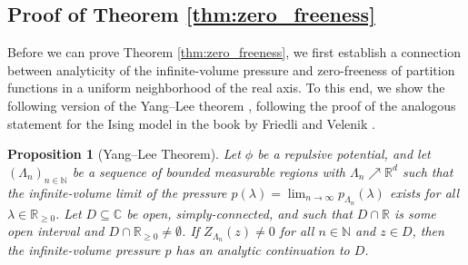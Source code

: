 \documentclass[10pt]{amsart}
\newtheorem{proposition}[theorem]{Proposition}
\theoremstyle{definition}
\theoremstyle{remark}
\newcommand{\N}{\mathbb{N}}
\newcommand{\R}{\mathbb{R}}
\newcommand{\C}{\mathbb{C}}
\newcommand{\region}{\Lambda}
\newcommand{\potential}{\phi}
\newcommand{\activity}{\lambda}
\begin{document}
	\subsection{Proof of Theorem \texorpdfstring{\ref{thm:zero_freeness}}{5.1}}
	Before we can prove Theorem \ref{thm:zero_freeness}, we first establish a connection between analyticity of the infinite-volume pressure and zero-freeness of partition functions in a uniform neighborhood of the real axis.
	To this end, we show the following version of the Yang--Lee theorem \cite{yang1952statistical}, following the proof of the analogous statement for the Ising model in the book by Friedli and Velenik \cite[Theorem 3.42]{friedli2017statistical}. 
	\begin{proposition}[Yang--Lee Theorem] \label{prop:leeyang}
		Let $\potential$ be a repulsive potential, and let $(\region_n)_{n \in \N}$ be a sequence of bounded measurable regions with $\region_n \nearrow \R^{d}$ such that the infinite-volume limit of the pressure $p(\activity) = \lim_{n \to \infty} p_{\region_n}(\activity)$ exists for all $\activity \in \R_{\ge 0}$.
		Let $D \subseteq \C$ be open, simply-connected, and such that $D \cap \R$ is some open interval and $D \cap \R_{\ge 0} \neq \emptyset$.
		If $Z_{\region_n}(z) \neq 0$ for all $n \in \N$ and $z \in D$, then the infinite-volume pressure $p$ has an analytic continuation to $D$.
	\end{proposition}
\end{document}
